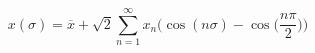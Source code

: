 \begin{equation}\label{eq110.2:ps}
x(\sigma)=\overline{x}+\sqrt{2}\sum^{\infty}_{n=1}x_{n}\Big(\cos(n\sigma)-\cos\Big(\frac{n\pi}{2}\Big)\Big)
\end{equation}

